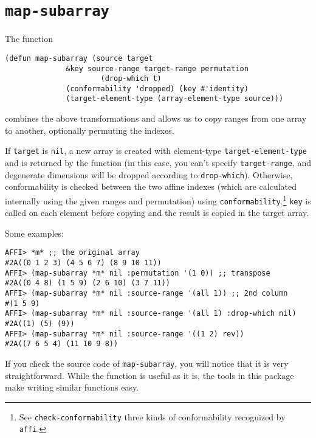 \documentclass[letterpaper,11pt]{article}
\begin{document}
\section{\lstinline!map-subarray!}
\label{sec:lstinl-subarr-an}

The function
\begin{lstlisting}
(defun map-subarray (source target 
		      &key source-range target-range permutation
                      (drop-which t)
		      (conformability 'dropped) (key #'identity)
		      (target-element-type (array-element-type source)))
\end{lstlisting}
combines the above transformations and allows us to copy ranges from
one array to another, optionally permuting the indexes.

If \lstinline!target! is \lstinline!nil!, a new array is created with
element-type \lstinline!target-element-type! and is returned by the
function (in this case, you can't specify \lstinline!target-range!,
and degenerate dimensions will be dropped according to
\lstinline!drop-which!). Otherwise, conformability is checked between
the two affine indexes (which are calculated internally using the
given ranges and permutation) using
\lstinline!conformability!.\footnote{See
  \lstinline!check-conformability! three kinds of conformability
  recognized by \lstinline!affi!.} \lstinline!key! is
called on each element before copying and the result is copied in the
target array.

Some examples:
\begin{lstlisting}
AFFI> *m* ;; the original array
#2A((0 1 2 3) (4 5 6 7) (8 9 10 11))
AFFI> (map-subarray *m* nil :permutation '(1 0)) ;; transpose
#2A((0 4 8) (1 5 9) (2 6 10) (3 7 11))
AFFI> (map-subarray *m* nil :source-range '(all 1)) ;; 2nd column
#(1 5 9)
AFFI> (map-subarray *m* nil :source-range '(all 1) :drop-which nil)
#2A((1) (5) (9))
AFFI> (map-subarray *m* nil :source-range '((1 2) rev))
#2A((7 6 5 4) (11 10 9 8))
\end{lstlisting}

If you check the source code of \lstinline!map-subarray!, you will
notice that it is very straightforward.  While the function is useful
as it is, the tools in this package make writing similar functions
easy.
\end{document}
